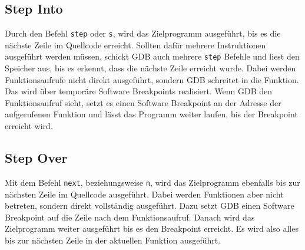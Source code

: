 \subsection{Step Into}
Durch den Befehl \texttt{step} oder \texttt{s}, wird das Zielprogramm ausgeführt, bis es die nächste Zeile im Quellcode erreicht. Sollten dafür mehrere Instruktionen ausgeführt werden müssen, schickt GDB auch mehrere \texttt{step} Befehle und liest den Speicher aus, bis es erkennt, dass die nächste Zeile erreicht wurde. Dabei werden Funktionsaufrufe nicht direkt ausgeführt, sondern GDB schreitet in die Funktion. Das wird über temporäre Software Breakpoints realisiert. Wenn GDB den Funktionsaufruf sieht, setzt es einen Software Breakpoint an der Adresse der aufgerufenen Funktion und lässt das Programm weiter laufen, bis der Breakpoint erreicht wird. 

\subsection{Step Over}
Mit dem Befehl \texttt{next}, beziehungsweise \texttt{n}, wird das Zielprogramm ebenfalls bis zur nächsten Zeile im Quellcode ausgeführt. Dabei werden Funktionen aber nicht betreten, sondern direkt vollständig ausgeführt. Dazu setzt GDB einen Software Breakpoint auf die Zeile nach dem Funktionsaufruf. Danach wird das Zielprogramm weiter ausgeführt bis es den Breakpoint erreicht. Es wird also alles bis zur nächsten Zeile in der aktuellen Funktion ausgeführt.